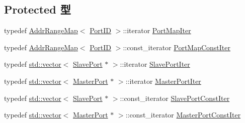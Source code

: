 \subsection*{Protected 型}
\begin{DoxyCompactItemize}
\item 
typedef \hyperlink{classAddrRangeMap}{AddrRangeMap}$<$ \hyperlink{base_2types_8hh_acef4d7d41cb21fdc252e20c04cd7bb8e}{PortID} $>$::iterator \hyperlink{classBaseBus_adedf751dd92daa01137db6149c004ea7}{PortMapIter}
\item 
typedef \hyperlink{classAddrRangeMap}{AddrRangeMap}$<$ \hyperlink{base_2types_8hh_acef4d7d41cb21fdc252e20c04cd7bb8e}{PortID} $>$::const\_\-iterator \hyperlink{classBaseBus_ad31cae2c5a87fd020ee036a5d94c7420}{PortMapConstIter}
\item 
typedef \hyperlink{classstd_1_1vector}{std::vector}$<$ \hyperlink{classSlavePort}{SlavePort} $\ast$ $>$::iterator \hyperlink{classBaseBus_a2b00f9fc9ba7e236c9757ea764cda19d}{SlavePortIter}
\item 
typedef \hyperlink{classstd_1_1vector}{std::vector}$<$ \hyperlink{classMasterPort}{MasterPort} $\ast$ $>$::iterator \hyperlink{classBaseBus_a44e87d907bdab92a2169caddd28979f9}{MasterPortIter}
\item 
typedef \hyperlink{classstd_1_1vector}{std::vector}$<$ \hyperlink{classSlavePort}{SlavePort} $\ast$ $>$::const\_\-iterator \hyperlink{classBaseBus_a4cfbb26aa06c3132b77227f45f39e224}{SlavePortConstIter}
\item 
typedef \hyperlink{classstd_1_1vector}{std::vector}$<$ \hyperlink{classMasterPort}{MasterPort} $\ast$ $>$::const\_\-iterator \hyperlink{classBaseBus_a19db300fe0038b9addfe69a31ef83b3d}{MasterPortConstIter}
\end{DoxyCompactItemize}
